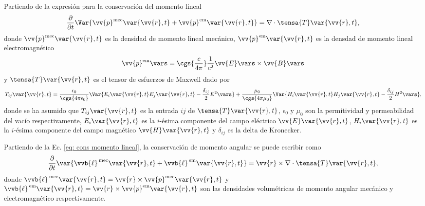 Partiendo de la expresión para la conservación del momento lineal \cite{jackson}
\begin{equation}
\frac{\partial}{\partial t} \Var{\vv{p}^{\rm mec}\var{\vv{r},t}+\vv{p}^{\rm em}\var{\vv{r},t}} = \nabla \cdot \tensa{T}\var{\vv{r},t},
\label{eq: cons momento lineal}
\end{equation}
donde $\vv{p}^{\rm mec}\var{\vv{r},t}$ es la densidad de momento lineal mecánico, $\vv{p}^{\rm em}\var{\vv{r},t}$ es la densdad de momento lineal electromagnético
\begin{equation}
\vv{p}^{\rm em}\vars = \cgs{\frac{c}{4\pi}}\frac{1}{c^2}\vv{E}\vars\times\vv{B}\vars
\end{equation}
y $\tensa{T}\var{\vv{r},t}$ es el tensor de esfuerzos de Maxwell dado por \cite{jackson}
\begin{equation}
T_{ij}\var{\vv{r},t}= \frac{\epsilon_0}{\cgs{4\pi\epsilon_0}} \Var{E_i\var{\vv{r},t}E_j\var{\vv{r},t} -\frac{\delta_{ij}}{2}E^2\vars} +  \frac{\mu_0}{\cgs{4\pi\mu_0}} \Var{ H_i\var{\vv{r},t}H_j\var{\vv{r},t} -\frac{\delta_{ij}}{2}H^2\vars } ,
\end{equation}
donde se ha asumido que $T_{ij}\var{\vv{r},t}$ es la entrada $ij$ de $\tensa{T}\var{\vv{r},t}$, $\epsilon_0$ y $\mu_0$ son la permitividad y permeabilidad del vacío respectivamente, $E_i\var{\vv{r},t}$ es la $i$-ésima componente del campo eléctrico $\vv{E}\var{\vv{r},t}$, $H_i\var{\vv{r},t}$ es la $i$-ésima componente del campo magnético $\vv{H}\var{\vv{r},t}$ y $\delta_{ij}$ es la delta de Kronecker. 

Partiendo de la Ec. \eqref{eq: cons momento lineal}, la conservación de momento angular se puede escribir como
\begin{equation}
\frac{\partial}{\partial t} \var{\vvb{\ell}^{\rm \, mec}\var{\vv{r},t}+\vvb{\ell}^{\rm \, em}\var{\vv{r},t}} = \vv{r}\times\nabla \cdot \tensa{T}\var{\vv{r},t},
\end{equation}
donde $\vvb{\ell}^{\rm \, mec}\var{\vv{r},t}=\vv{r}\times\vv{p}^{\rm mec}\var{\vv{r},t}$ y $\vvb{\ell}^{\rm \, em}\var{\vv{r},t}=\vv{r}\times\vv{p}^{\rm em}\var{\vv{r},t}$ son las densidades volumétricas de momento angular mecánico y electromagnético respectivamente.

